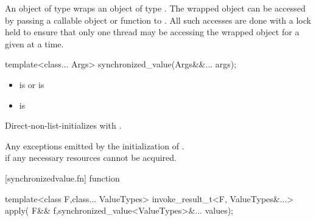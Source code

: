 \pnum   
An object of type 
wraps an object of type . The wrapped object can be accessed
by passing a callable object or function to . All such
accesses are done with a lock held to ensure that only one thread may be
accessing the wrapped object for a given  at
a time.

\begin{itemdecl}

template<class... Args>
synchronized_value(Args&&... args);
\end{itemdecl}



\begin{itemdescr}
\pnum
\constraints
\begin{itemize}
\item 
   is  or
  is 
\item
   is
\end{itemize}
\pnum
\effects
Direct-non-list-initializes \emph{} with
.

\pnum
\throws
Any exceptions emitted by the initialization of \emph{}.\\
 if any necessary resources cannot be acquired.
\end{itemdescr}


[synchronizedvalue.fn]{ function }

\begin{itemdecl}
    template<class F,class... ValueTypes>
    invoke_result_t<F, ValueTypes&...> apply(
        F&& f,synchronized_value<ValueTypes>&... values);
\end{itemdecl}

